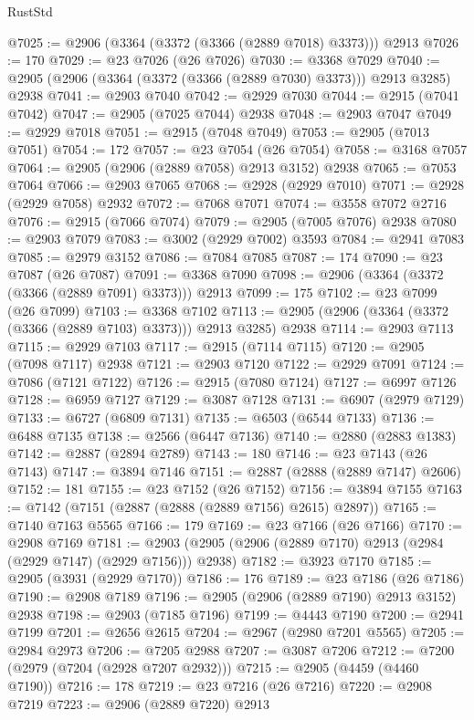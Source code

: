 \begin{lexlean}{RustStd}
\begin{coremodule}
@7025 := @2906 (@3364 (@3372 (@3366 (@2889 @7018) @3373))) @2913
@7026 := 170
@7029 := @23 @7026 (@26 @7026)
@7030 := @3368 @7029
@7040 := @2905 (@2906 (@3364 (@3372 (@3366 (@2889 @7030) @3373))) @2913 @3285) @2938
@7041 := @2903 @7040
@7042 := @2929 @7030
@7044 := @2915 (@7041 @7042)
@7047 := @2905 (@7025 @7044) @2938
@7048 := @2903 @7047
@7049 := @2929 @7018
@7051 := @2915 (@7048 @7049)
@7053 := @2905 (@7013 @7051)
@7054 := 172
@7057 := @23 @7054 (@26 @7054)
@7058 := @3168 @7057
@7064 := @2905 (@2906 (@2889 @7058) @2913 @3152) @2938
@7065 := @7053 @7064
@7066 := @2903 @7065
@7068 := @2928 (@2929 @7010)
@7071 := @2928 (@2929 @7058) @2932
@7072 := @7068 @7071
@7074 := @3558 @7072 @2716
@7076 := @2915 (@7066 @7074)
@7079 := @2905 (@7005 @7076) @2938
@7080 := @2903 @7079
@7083 := @3002 (@2929 @7002) @3593
@7084 := @2941 @7083
@7085 := @2979 @3152
@7086 := @7084 @7085
@7087 := 174
@7090 := @23 @7087 (@26 @7087)
@7091 := @3368 @7090
@7098 := @2906 (@3364 (@3372 (@3366 (@2889 @7091) @3373))) @2913
@7099 := 175
@7102 := @23 @7099 (@26 @7099)
@7103 := @3368 @7102
@7113 := @2905 (@2906 (@3364 (@3372 (@3366 (@2889 @7103) @3373))) @2913 @3285) @2938
@7114 := @2903 @7113
@7115 := @2929 @7103
@7117 := @2915 (@7114 @7115)
@7120 := @2905 (@7098 @7117) @2938
@7121 := @2903 @7120
@7122 := @2929 @7091
@7124 := @7086 (@7121 @7122)
@7126 := @2915 (@7080 @7124)
@7127 := @6997 @7126
@7128 := @6959 @7127
@7129 := @3087 @7128
@7131 := @6907 (@2979 @7129)
@7133 := @6727 (@6809 @7131)
@7135 := @6503 (@6544 @7133)
@7136 := @6488 @7135
@7138 := @2566 (@6447 @7136)
@7140 := @2880 (@2883 @1383)
@7142 := @2887 (@2894 @2789)
@7143 := 180
@7146 := @23 @7143 (@26 @7143)
@7147 := @3894 @7146
@7151 := @2887 (@2888 (@2889 @7147) @2606)
@7152 := 181
@7155 := @23 @7152 (@26 @7152)
@7156 := @3894 @7155
@7163 := @7142 (@7151 (@2887 (@2888 (@2889 @7156) @2615) @2897))
@7165 := @7140 @7163 @5565
@7166 := 179
@7169 := @23 @7166 (@26 @7166)
@7170 := @2908 @7169
@7181 := @2903 (@2905 (@2906 (@2889 @7170) @2913 (@2984 (@2929 @7147) (@2929 @7156))) @2938)
@7182 := @3923 @7170
@7185 := @2905 (@3931 (@2929 @7170))
@7186 := 176
@7189 := @23 @7186 (@26 @7186)
@7190 := @2908 @7189
@7196 := @2905 (@2906 (@2889 @7190) @2913 @3152) @2938
@7198 := @2903 (@7185 @7196)
@7199 := @4443 @7190
@7200 := @2941 @7199
@7201 := @2656 @2615
@7204 := @2967 (@2980 @7201 @5565)
@7205 := @2984 @2973
@7206 := @7205 @2988
@7207 := @3087 @7206
@7212 := @7200 (@2979 (@7204 (@2928 @7207 @2932)))
@7215 := @2905 (@4459 (@4460 @7190))
@7216 := 178
@7219 := @23 @7216 (@26 @7216)
@7220 := @2908 @7219
@7223 := @2906 (@2889 @7220) @2913

\end{coremodule}
\end{lexlean}

